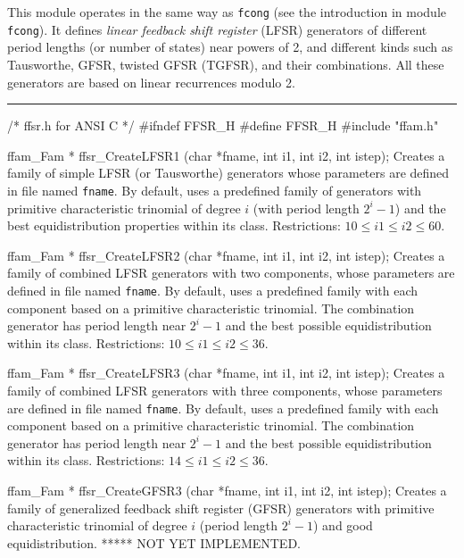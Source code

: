 
This module operates in the same way as {\tt fcong}
(see the introduction in module  {\tt fcong}).
It defines {\em linear feedback shift register\/} (LFSR) generators
of different period lengths (or number of states) near powers of 2,
and different kinds such as Tausworthe, GFSR, twisted GFSR (TGFSR),
and their combinations.
All these generators are based on linear recurrences modulo 2.
%


\bigskip
\hrule
\code\hide
/* ffsr.h  for ANSI C */
#ifndef FFSR_H
#define FFSR_H
\endhide
#include "ffam.h"
\endcode



\code

ffam_Fam * ffsr_CreateLFSR1 (char *fname, int i1, int i2, int istep);
\endcode
\tab
 Creates a family of simple LFSR (or Tausworthe) generators whose
 parameters are defined in file named {\tt fname}. By default, uses a 
 predefined family of generators with primitive characteristic trinomial of
 degree $i$ (with period length $2^i-1$) and the best equidistribution 
 properties within its class.
 Restrictions: $10 \le i1 \le i2 \le 60$.
\endtab
\code


ffam_Fam * ffsr_CreateLFSR2 (char *fname, int i1, int i2, int istep);
\endcode
\tab Creates a family of combined LFSR generators with two components, whose
 parameters are defined in file named {\tt fname}. By default, uses a 
 predefined family  with each component
 based on a primitive characteristic trinomial.
 The combination generator has period length near $2^i-1$ and the best
 possible equidistribution within its class. 
 Restrictions: $10 \le i1 \le i2 \le 36$.
\endtab
\code


ffam_Fam * ffsr_CreateLFSR3 (char *fname, int i1, int i2, int istep);
\endcode
\tab
 Creates a family of combined LFSR generators with three components, whose
 parameters are defined in file named {\tt fname}. By default, uses a 
 predefined family with each component
 based on a primitive characteristic trinomial.
 The combination generator has period length near $2^i-1$ and the best
 possible equidistribution within its class. 
 Restrictions: $14 \le i1 \le i2 \le 36$.
\endtab
\code


ffam_Fam * ffsr_CreateGFSR3 (char *fname, int i1, int i2, int istep);
\endcode
\tab
 Creates a family of generalized feedback shift register (GFSR) generators
 with primitive characteristic trinomial of degree $i$
 (period length $2^i-1$) and good equidistribution.
 ***** NOT YET IMPLEMENTED.
\endtab
\code


